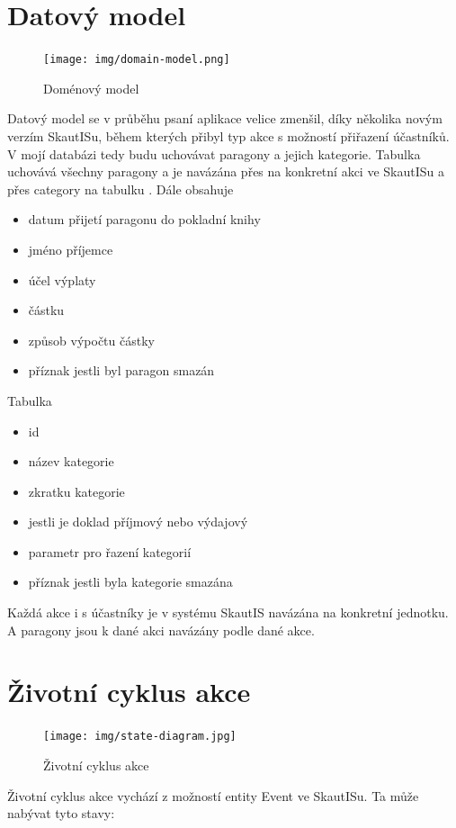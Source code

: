 \documentclass[thesis=B,czech]{FITthesis}[2011/06/14]
\begin{document}
\section{Datový model}
\begin{figure}[h] \centering
 	\texttt{[image: img/domain-model.png]}
 	\caption[SkautIS]{Doménový model}\label{fig:domain-model}
\end{figure}
Datový model se v průběhu psaní aplikace velice zmenšil, díky několika novým verzím SkautISu, během kterých přibyl typ akce  s možností přiřazení účastníků. V mojí databázi tedy budu uchovávat paragony a jejich kategorie. 
Tabulka  uchovává všechny paragony a je navázána přes  na konkretní akci ve SkautISu a přes category na tabulku . Dále obsahuje 
 \begin{itemize}
 	\item datum přijetí paragonu do pokladní knihy
 	\item jméno příjemce
 	\item účel výplaty  
 	\item částku 
	\item způsob výpočtu částky
	\item příznak jestli byl paragon smazán
\end{itemize} 

Tabulka  
 \begin{itemize}
 	\item id
 	\item název kategorie
 	\item zkratku kategorie
 	\item jestli je doklad příjmový nebo výdajový
 	\item parametr pro řazení kategorií
 	\item příznak jestli byla kategorie smazána 
\end{itemize}
Každá akce i s účastníky je v systému SkautIS navázána na konkretní jednotku. A paragony jsou k dané akci navázány podle  dané akce. 

\section{Životní cyklus akce}
 \begin{figure}[h] \centering
 	\texttt{[image: img/state-diagram.jpg]}
 	\caption[Životní cyklus akce]{Životní cyklus akce}\label{fig:state-diagram}
 \end{figure}
 Životní cyklus akce vychází z možností entity Event ve SkautISu. Ta může nabývat tyto stavy:
 
\end{document}
